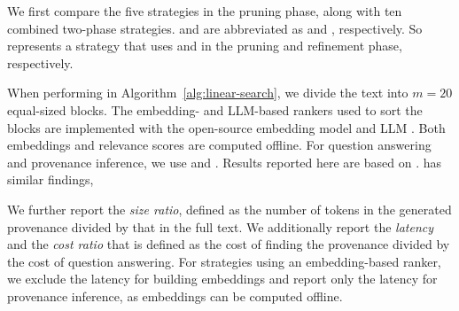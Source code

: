 
 We first compare the five strategies in the pruning phase, along with ten combined two-phase strategies. %
 and  are abbreviated as  and , respectively.  So  represents a strategy that uses  and  in the pruning and refinement phase, respectively.    


 When performing  in Algorithm~\ref{alg:linear-search}, we divide the text into $m=20$ equal-sized blocks. The embedding- and LLM-based rankers used to sort the blocks are implemented with the open-source embedding model  and LLM . Both  embeddings and relevance scores are computed offline. For question answering and provenance inference, we use  and . Results reported here are based on .  has similar findings,  


   We further report the {\em size ratio}, defined as the number of tokens in the generated provenance divided by that in the full text. We additionally report the {\em latency} and the {\em cost ratio} that is defined as the cost of finding the provenance divided by the cost of question answering. 
For strategies using an embedding-based ranker, we exclude the latency for building embeddings and report only the latency for provenance inference, as embeddings can be computed offline. 


